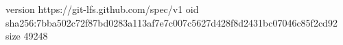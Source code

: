 version https://git-lfs.github.com/spec/v1
oid sha256:7bba502c72f87bd0283a113af7e7c007c5627d428f8d2431bc07046c85f2cd92
size 49248
